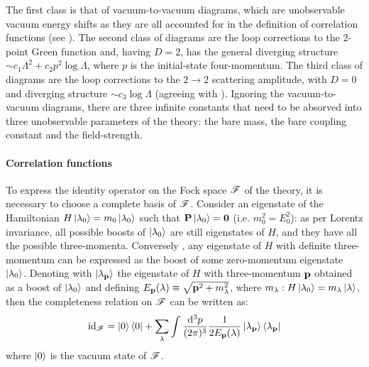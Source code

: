 The first class is that of vacuum-to-vacuum diagrams, which are unobservable vacuum energy shifts as they are all accounted for in the definition of correlation functions (see ).
The second class of diagrams are the loop corrections to the $ 2 $-point Green function and, having $ D = 2 $, has the general diverging structure $ \sim c_1 \Lambda^2 + c_2 p^2 \log \Lambda $, where $ p $ is the initial-state four-momentum.
The third class of diagrams are the loop corrections to the $ 2 \rightarrow 2 $ scattering amplitude, with $ D = 0 $ and diverging structure $ \sim c_3 \log \Lambda $ (agreeing with ).
Ignoring the vacuum-to-vacuum diagrams, there are three infinite constants that need to be absorved into three unobservable parameters of the theory: the bare mass, the bare coupling constant and the field-strength.

\paragraph{Correlation functions}

To express the identity operator on the Fock space $ \mathscr{F} $ of the theory, it is necessary to choose a complete basis of $ \mathscr{F} $. Consider an eigenstate of the Hamiltonian $ H \ket{\lambda_0} = m_0 \ket{\lambda_0} $ such that $ \mathbf{P} \ket{\lambda_0} = \mathbf{0} $ (i.e. $ m_0^2 = E_0^2 $): as per Lorentz invariance, all possible boosts of $ \ket{\lambda_0} $ are still eigenstates of $ H $, and they have all the possible three-momenta. Conversely , any eigenstate of $ H $ with definite three-momentum can be expressed as the boost of some zero-momentum eigenstate $ \ket{\lambda_0} $. Denoting with $ \ket{\lambda_{\mathbf{p}}} $ the eigenstate of $ H $ with three-momentum $ \mathbf{p} $ obtained as a boost of $ \ket{\lambda_0} $ and defining $ E_{\mathbf{p}}(\lambda) \equiv \sqrt{\mathbf{p}^2 + m_\lambda^2} $, where $ m_\lambda : H \ket{\lambda_0} = m_\lambda \ket{\lambda} $, then the completeness relation on $ \mathscr{F} $ can be written as\footnotemark:
\begin{equation}
  \operatorname{id}_{\mathscr{F}} = \ket{0}\bra{0} + \sum_\lambda \int \frac{\mathrm{d}^3p}{(2\pi)^3} \frac{1}{2E_{\mathbf{p}}(\lambda)} \ket{\lambda_{\mathbf{p}}}\bra{\lambda_{\mathbf{p}}}
\end{equation}
where $ \ket{0} $ is the vacuum state of $ \mathscr{F} $.


